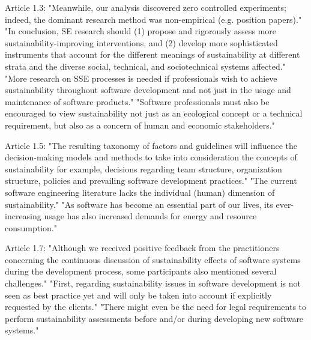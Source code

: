 \begin{itemize}
Article 1.3:
"Meanwhile, our analysis discovered zero controlled experiments; indeed, the dominant research method was non-empirical (e.g. position papers)." 
"In conclusion, SE research should (1) propose and rigorously assess more sustainability-improving interventions, and (2) develop more sophisticated instruments that account for the different meanings of sustainability at different strata and the diverse social, technical, and sociotechnical systems affected." 
"More research on SSE processes is needed if professionals wish to achieve sustainability throughout software development and not just in the usage and maintenance of software products." 
"Software professionals must also be encouraged to view sustainability not just as an ecological concept or a technical requirement, but also as a concern of human and economic stakeholders." 

Article 1.5:
"The resulting taxonomy of factors and guidelines will influence the decision-making models and methods to take into consideration the concepts of sustainability for example, decisions regarding team structure, organization structure, policies and prevailing software development practices." 
"The current software engineering literature lacks the individual (human) dimension of sustainability." 
"As software has become an essential part of our lives, its ever-increasing usage has also increased demands for energy and resource consumption."

Article 1.7:
"Although we received positive feedback from the practitioners concerning the continuous discussion of sustainability effects of software systems during the development process, some participants also mentioned several challenges." 
"First, regarding sustainability issues in software development is not seen as best practice yet and will only be taken into account if explicitly requested by the clients." 
"There might even be the need for legal requirements to perform sustainability assessments before and/or during developing new software systems."

\end{itemize}

